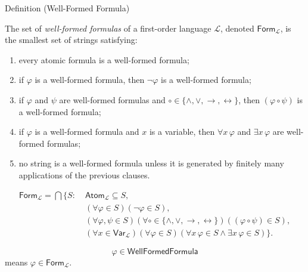 \begin{definitionbox}{Definition (Well-Formed Formula)}
\begin{definition}
\label{def:wff-pred}
The set of \emph{well-formed formulas} of a first-order language
\(\mathcal L\), denoted \(\mathsf{Form}_{\mathcal L}\), is the smallest set of
strings satisfying:
\begin{enumerate}
\item every atomic formula is a well-formed formula;
\item if \(\varphi\) is a well-formed formula, then
      \(\neg\varphi\) is a well-formed formula;
\item if \(\varphi\) and \(\psi\) are well-formed formulas and
      \(\circ\in\{\land,\lor,\to,\leftrightarrow\}\), then
      \((\varphi\circ\psi)\) is a well-formed formula;
\item if \(\varphi\) is a well-formed formula and \(x\) is a variable, then
      \(\forall x\,\varphi\) and \(\exists x\,\varphi\) are well-formed
      formulas;
\item no string is a well-formed formula unless it is generated by finitely
      many applications of the previous clauses.
\end{enumerate}
\end{definition}
\end{definitionbox}

\begin{remark*}
\[
\begin{aligned}
\mathsf{Form}_{\mathcal L}
=
\bigcap\{S:\;&
\mathsf{Atom}_{\mathcal L}\subseteq S,\\
&(\forall\varphi\in S)(\neg\varphi\in S),\\
&(\forall\varphi,\psi\in S)
(\forall\circ\in\{\land,\lor,\to,\leftrightarrow\})
((\varphi\circ\psi)\in S),\\
&(\forall x\in\mathsf{Var}_{\mathcal L})(\forall\varphi\in S)
(\forall x\,\varphi\in S\land \exists x\,\varphi\in S)\}.
\end{aligned}
\]
\end{remark*}

\begin{remark*}
\[
  \varphi\in\mathsf{WellFormedFormula}
\] means
\(\varphi\in\mathsf{Form}_{\mathcal L}\).
\end{remark*}

